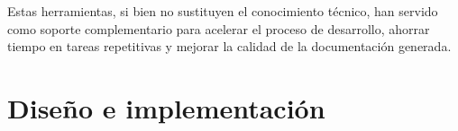 \documentclass[a4paper, 12pt]{book}
\begin{document}
Estas herramientas, si bien no sustituyen el conocimiento técnico, han servido como soporte complementario para acelerar el proceso de desarrollo, ahorrar tiempo en tareas repetitivas y mejorar la calidad de la documentación generada.









\cleardoublepage
\chapter{Diseño e implementación}
\label{sec:diseno}
\end{document}

